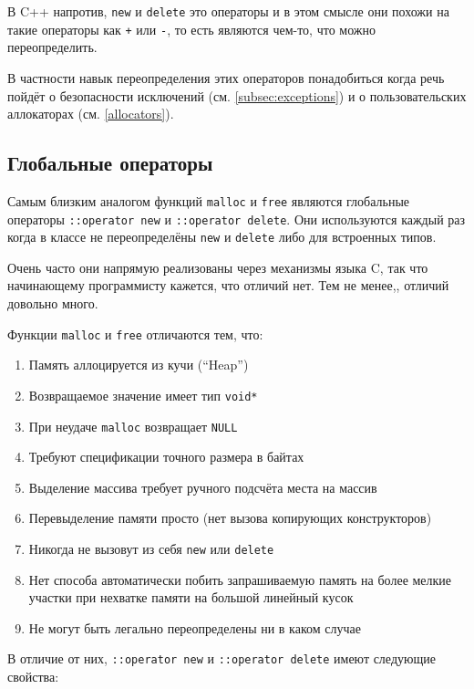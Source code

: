 \documentclass[a4paper,12pt,oneside]{book}
\begin{document}
В C++ напротив, \lstinline!new! и \lstinline!delete! это операторы и в этом смысле они похожи на такие операторы как \lstinline!+! или \lstinline!-!, то есть являются чем-то, что можно переопределить.

В частности навык переопределения этих операторов понадобиться когда речь пойдёт о безопасности исключений (см. \ref{subsec:exceptions}) и о пользовательских аллокаторах (см. \ref{allocators}).

\subsection{Глобальные операторы}\label{subsub:globalnew}

Самым близким аналогом функций \lstinline!malloc! и \lstinline!free! являются глобальные операторы \lstinline!::operator new! и \lstinline!::operator delete!. Они используются каждый раз когда в классе не переопределёны \lstinline!new! и \lstinline!delete! либо для встроенных типов.

Очень часто они напрямую реализованы через механизмы языка C, так что начинающему программисту кажется, что отличий нет. Тем не менее,, отличий довольно много.

Функции \lstinline!malloc! и \lstinline!free! отличаются тем, что:

\begin{enumerate}
\item
Память аллоцируется из кучи (``Heap'')
\item
Возвращаемое значение имеет тип \lstinline!void*!
\item
При неудаче \lstinline!malloc! возвращает \lstinline!NULL!
\item
Требуют спецификации точного размера в байтах
\item
Выделение массива требует ручного подсчёта места на массив
\item
Перевыделение памяти просто (нет вызова копирующих конструкторов)
\item
Никогда не вызовут из себя \lstinline!new! или \lstinline!delete!
\item
Нет способа автоматически побить запрашиваемую память на более мелкие участки при нехватке памяти на большой линейный кусок
\item
Не могут быть легально переопределены ни в каком случае
\end{enumerate}

В отличие от них, \lstinline!::operator new! и \lstinline!::operator delete! имеют следующие свойства:
\end{document}
